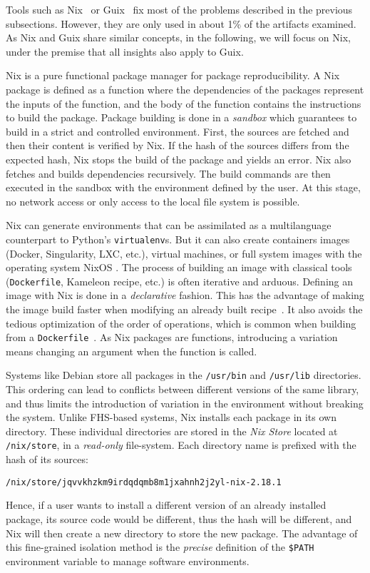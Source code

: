 \documentclass[sigconf,natbib=false]{acmart}
\begin{document}
Tools such as Nix\ \cite{dolstra_nix_2004} or Guix\ \cite{courtes_functional_2013} fix most of the problems described in the previous subsections.
However, they are only used in about 1\% of the artifacts examined.
As Nix and Guix share similar concepts, in the following, we will focus on Nix, under the premise that all insights also apply to Guix.

Nix is a pure functional package manager for package reproducibility.
A Nix package is defined as a function where the dependencies of the packages represent the inputs of the function, and the body of the function contains the instructions to build the package.
Package building is done in a \emph{sandbox} which guarantees to build in a strict and controlled environment.
First, the sources are fetched and then their content is verified by Nix.
If the hash of the sources differs from the expected hash, Nix stops the build of the package and yields an error.
Nix also fetches and builds dependencies recursively.
The build commands are then executed in the sandbox with the environment defined by the user.
At this stage, no network access or only access to the local file system is possible.

Nix can generate environments that can be assimilated as a multilanguage counterpart to Python's \texttt{virtualenv}s.
But it can also create containers images (Docker, Singularity, LXC, etc.), virtual machines, or full system images with the operating system NixOS \cite{nixos_2008}.
The process of building an image with classical tools (\texttt{Dockerfile}, Kameleon recipe, etc.) is often iterative and arduous.
Defining an image with Nix is done in a \emph{declarative} fashion.
This has the advantage of making the image build faster when modifying an already built recipe\ \cite{nxc}.
It also avoids the tedious optimization of the order of operations, which is common when building from a \texttt{Dockerfile}\ \cite{docker_cache}. 
As Nix packages are functions, introducing a variation means changing an argument when the function is called.

Systems like Debian store all packages in the \texttt{/usr/bin} and \texttt{/usr/lib} directories.
This ordering can lead to conflicts between different versions of the same library, and thus limits the introduction of variation in the environment without breaking the system.
Unlike FHS-based systems, Nix installs each package in its own directory.
These individual directories are stored in the \emph{Nix Store} located at \texttt{/nix/store}, in a \emph{read-only} file-system.
Each directory name is prefixed with the hash of its sources:
\begin{verbatim}
/nix/store/jqvvkhzkm9irdqdqmb8m1jxahnh2j2yl-nix-2.18.1
\end{verbatim}
Hence, if a user wants to install a different version of an already installed package, its source code would be different, thus the hash will be different, and Nix will then create a new directory to store the new package.
The advantage of this fine-grained isolation method is the \emph{precise} definition of the \texttt{\$PATH} environment variable to manage software environments.
\end{document}
